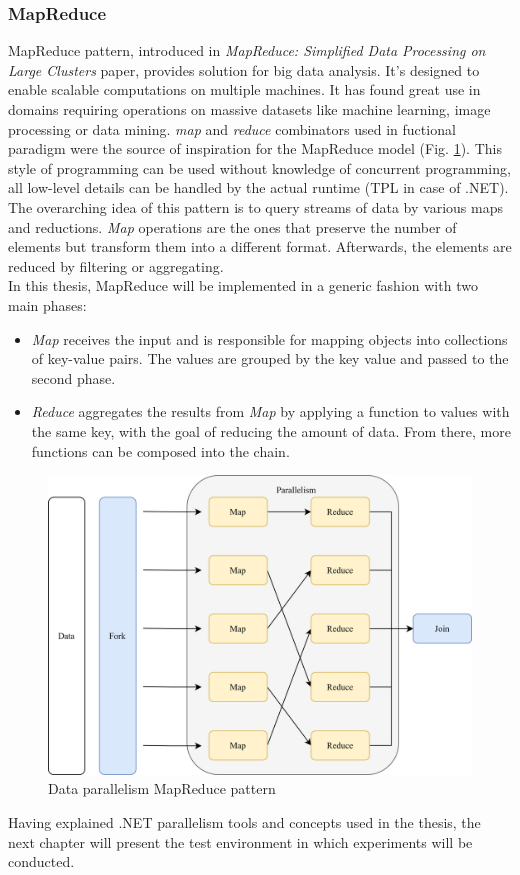 \subsubsection{MapReduce}
\label{sec:MapReduce}
MapReduce pattern, introduced in \emph{MapReduce: Simplified
Data Processing on Large Clusters} \cite{MapReduce} paper, provides solution for big data analysis. It's designed to enable scalable computations on multiple machines. It has found great use in domains requiring operations on massive datasets like machine learning, image processing or data mining.
\emph{map} and \emph{reduce} combinators used in fuctional paradigm were the source of inspiration for the MapReduce model (Fig. \ref{fig:MapReduce}). This style of programming can be used without knowledge of concurrent programming, all low-level details can be handled by the actual runtime (TPL in case of .NET).
The overarching idea of this pattern is to query streams of data by various maps and reductions. \emph{Map} operations are the ones that preserve the number of elements but transform them into a different format. Afterwards, the elements are reduced by filtering or aggregating. \\
In this thesis, MapReduce will be implemented in a generic fashion with two main phases:
\begin{itemize}
	\item \emph{Map} receives the input and is responsible for mapping objects into collections of key-value pairs. The values are grouped by the key value and passed to the second phase.
\item \emph{Reduce} aggregates the results from \emph{Map} by applying a function to values with the same key, with the goal of reducing the amount of data. From there, more functions can be composed into the chain.
\end{itemize}

\begin{figure}[htb]
	\centering
		\includegraphics[scale=1.0]{figures02/mapreduce.png}
		\caption{Data parallelism MapReduce pattern}
		\label{fig:MapReduce}
\end{figure}

Having explained .NET parallelism tools and concepts used in the thesis, the next chapter will present the test environment in which experiments will be conducted. 
